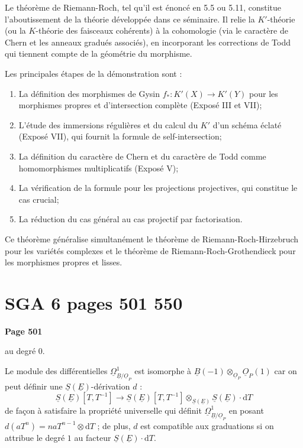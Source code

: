 Le théorème de Riemann-Roch, tel qu'il est énoncé en 5.5 ou 5.11, constitue l'aboutissement de la théorie développée dans ce séminaire. Il relie la $K'$-théorie (ou la $K$-théorie des faisceaux cohérents) à la cohomologie (via le caractère de Chern et les anneaux gradués associés), en incorporant les corrections de Todd qui tiennent compte de la géométrie du morphisme.

Les principales étapes de la démonstration sont :
\begin{enumerate}
\item La définition des morphismes de Gysin $f_* : K'(X) \to K'(Y)$ pour les morphismes propres et d'intersection complète (Exposé III et VII);
\item L'étude des immersions régulières et du calcul du $K'$ d'un schéma éclaté (Exposé VII), qui fournit la formule de self-intersection;
\item La définition du caractère de Chern et du caractère de Todd comme homomorphismes multiplicatifs (Exposé V);
\item La vérification de la formule pour les projections projectives, qui constitue le cas crucial;
\item La réduction du cas général au cas projectif par factorisation.
\end{enumerate}

Ce théorème généralise simultanément le théorème de Riemann-Roch-Hirzebruch pour les variétés complexes et le théorème de Riemann-Roch-Grothendieck pour les morphismes propres et lisses.


\clearpage
{}
\section*{SGA 6 pages 501 550}
\setcounter{page}{501}

\noindent\textbf{Page 501}

au degr\'e $0$.

Le module des diff\'erentielles $\underline{\Omega}^1_{\underline{B}/\underline{O}_P}$ est isomorphe \`a $\underline{B}(-1) \otimes_{\underline{O}_P} \underline{O}_P(1)$ car on peut d\'efinir une $\underline{S}(\underline{E})$-d\'erivation $d$ :
\[
\underline{S}(\underline{E})[T,T^{-1}] \longrightarrow \underline{S}(\underline{E})[T,T^{-1}] \otimes_{\underline{S}(\underline{E})} \underline{S}(\underline{E}) \cdot \mathrm{d}T
\]
de fa\c{c}on \`a satisfaire la propri\'et\'e universelle qui d\'efinit $\underline{\Omega}^1_{\underline{B}/\underline{O}_P}$ en posant $d(aT^n) = naT^{n-1} \otimes \mathrm{d}T$ ; de plus, $d$ est compatible aux graduations si on attribue le degr\'e $1$ au facteur $\underline{S}(\underline{E}) \cdot \mathrm{d}T$.

